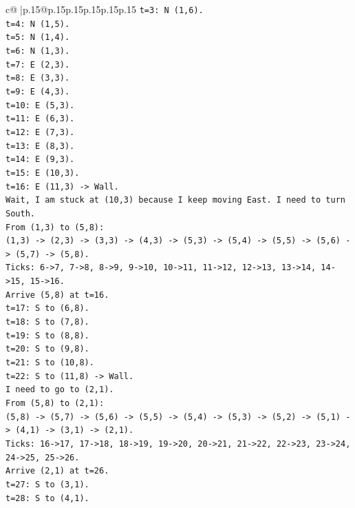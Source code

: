 \documentclass{article}
\begin{document}
{\begin{supertabular}{c@{$\;$}|p{.15\linewidth}@{}p{.15\linewidth}p{.15\linewidth}p{.15\linewidth}p{.15\linewidth}p{.15\linewidth}}
{{{\texttt{t=3: N (1,6).} \\
\texttt{t=4: N (1,5).} \\
\texttt{t=5: N (1,4).} \\
\texttt{t=6: N (1,3).} \\
\texttt{t=7: E (2,3).} \\
\texttt{t=8: E (3,3).} \\
\texttt{t=9: E (4,3).} \\
\texttt{t=10: E (5,3).} \\
\texttt{t=11: E (6,3).} \\
\texttt{t=12: E (7,3).} \\
\texttt{t=13: E (8,3).} \\
\texttt{t=14: E (9,3).} \\
\texttt{t=15: E (10,3).} \\
\texttt{t=16: E (11,3) {-}> Wall.} \\
\texttt{Wait, I am stuck at (10,3) because I keep moving East. I need to turn South.} \\
\texttt{From (1,3) to (5,8):} \\
\texttt{(1,3) {-}> (2,3) {-}> (3,3) {-}> (4,3) {-}> (5,3) {-}> (5,4) {-}> (5,5) {-}> (5,6) {-}> (5,7) {-}> (5,8).} \\
\texttt{Ticks: 6{-}>7, 7{-}>8, 8{-}>9, 9{-}>10, 10{-}>11, 11{-}>12, 12{-}>13, 13{-}>14, 14{-}>15, 15{-}>16.} \\
\texttt{Arrive (5,8) at t=16.} \\
\texttt{t=17: S to (6,8).} \\
\texttt{t=18: S to (7,8).} \\
\texttt{t=19: S to (8,8).} \\
\texttt{t=20: S to (9,8).} \\
\texttt{t=21: S to (10,8).} \\
\texttt{t=22: S to (11,8) {-}> Wall.} \\
\texttt{I need to go to (2,1).} \\
\texttt{From (5,8) to (2,1):} \\
\texttt{(5,8) {-}> (5,7) {-}> (5,6) {-}> (5,5) {-}> (5,4) {-}> (5,3) {-}> (5,2) {-}> (5,1) {-}> (4,1) {-}> (3,1) {-}> (2,1).} \\
\texttt{Ticks: 16{-}>17, 17{-}>18, 18{-}>19, 19{-}>20, 20{-}>21, 21{-}>22, 22{-}>23, 23{-}>24, 24{-}>25, 25{-}>26.} \\
\texttt{Arrive (2,1) at t=26.} \\
\texttt{t=27: S to (3,1).} \\
\texttt{t=28: S to (4,1).} \\
}}}
\end{supertabular}}
\end{document}
